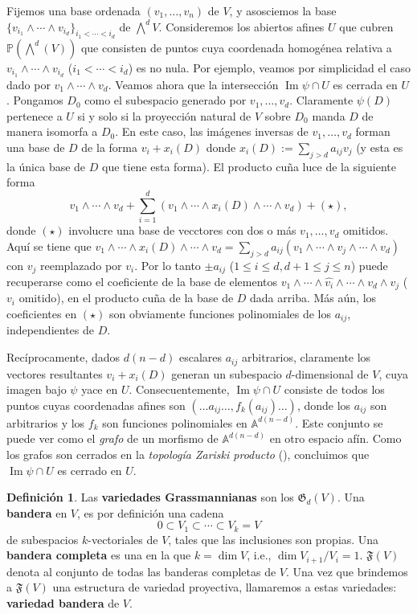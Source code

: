 \documentclass[spanish,10pt]{amsart}
\theoremstyle{definition}
\newtheorem{definition}[theorem]{Definición}
\theoremstyle{remark}
\numberwithin{equation}{section}
\newcommand{\afine}[1]{\mathbb{A}^{#1}}
\newcommand{\Imagen}{\operatorname{Im}}
\renewcommand{\hat}[1]{\widehat{#1}}
\begin{document}
Fijemos una base ordenada $(v_1, \ldots, v_n)$ de $V$, y asosciemos la base $\{v_{i_1} \wedge \cdots \wedge v_{i_d}\}_{i_1 < \cdots < i_d}$ de $\bigwedge^d V$. Consideremos los abiertos afines $U$ que cubren $\mathbb{P} (\bigwedge^d (V))$ que consisten de puntos cuya coordenada homogénea relativa a $v_{i_1} \wedge \cdots \wedge v_{i_d}$ ($i_1 < \cdots < i_d$) es no nula. Por ejemplo, veamos por simplicidad el caso dado por $v_1 \wedge \cdots \wedge v_d$. Veamos ahora que la intersección $\Imagen \psi \cap U$ es cerrada en $U$. Pongamos $D_0$ como el subespacio generado por $v_1, \ldots, v_d$. Claramente $\psi (D)$ pertenece a $U$ si y solo si la proyección natural de $V$ sobre $D_0$ manda $D$ de manera isomorfa a $D_0$. En este caso, las imágenes inversas de $v_1, \ldots, v_d$ forman una base de $D$ de la forma $v_i + x_i (D)$ donde $x_i (D) := \sum_{j > d} a_{ij} v_j$ (y esta es la única base de $D$ que tiene esta forma). El producto cuña luce de la siguiente forma
\[
    v_1 \wedge \cdots \wedge v_d + \sum_{i = 1}^d (v_1 \wedge \cdots \wedge x_i (D) \wedge \cdots \wedge v_d) + (\star),
\]
donde $(\star)$ involucre una base de vecctores con dos o más $v_1, \ldots, v_d$ omitidos. Aquí se tiene que $v_1 \wedge \cdots \wedge x_i (D) \wedge \cdots \wedge v_d = \sum_{j > d} a_{ij} (v_1 \wedge \cdots \wedge v_j \wedge \cdots \wedge v_d)$ con $v_j$ reemplazado por $v_i$. Por lo tanto $\pm a_{ij}$ ($ 1 \leq i \leq d, d + 1 \leq j \leq n$) puede recuperarse como el coeficiente de la base de elementos $v_1 \wedge \cdots \wedge \hat {v_i} \wedge \cdots \wedge v_d \wedge v_j$ ($v_i$ omitido), en el producto cuña de la base de $D$ dada arriba. Más aún, los coeficientes en $(\star)$ son obviamente funciones polinomiales de los $a_{ij}$, independientes de $D$.

Recíprocamente, dados $d (n-d)$ escalares $a_{ij}$ arbitrarios, claramente los vectores resultantes $v_i + x_i (D)$ generan un subespacio $d$-dimensional de $V$, cuya imagen bajo $\psi$ yace en $U$. Consecuentemente, $\Imagen \psi \cap U$ consiste de todos los puntos cuyas coordenadas afines son $(\ldots a_{ij} \ldots, f_k (a_{ij}) \ldots)$, donde los $a_{ij}$ son arbitrarios y los $f_k$ son funciones polinomiales en $\afine {d (n-d)}$. Este conjunto se puede ver como el \textit{grafo} de un morfismo de $\afine{d (n-d)}$ en otro espacio afín. Como los grafos son cerrados en la \textit{topología Zariski producto} (\cite[Teorema 2.6.12.]{notas_pedro}), concluimos que $\Imagen \psi \cap U$ es cerrado en $U$.

\begin{definition}
Las \textbf{variedades Grassmannianas} son los $\mathfrak G _d (V)$. Una \textbf{bandera} en $V$, es por definición una cadena
\[
    0 \subset V_1 \subset \cdots \subset V_k = V
\]
de subespacios $k$-vectoriales de $V$, tales que las inclusiones son propias. Una \textbf{bandera completa} es una en la que $k = \dim V$, i.e., $\dim V_{i+1}/V_i = 1$. $\mathfrak F (V)$ denota al conjunto de todas las banderas completas de $V$. Una vez que brindemos a $\mathfrak F (V)$ una estructura de variedad proyectiva, llamaremos a estas variedades: \textbf{variedad bandera} de $V$.
\end{definition}
\end{document}
